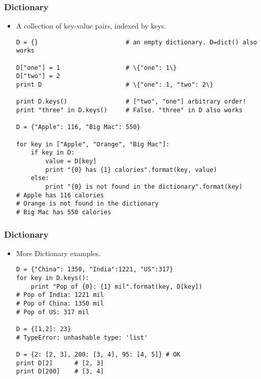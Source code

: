 \documentclass{beamer}
\begin{document}
\begin{frame}[fragile]
\frametitle{Dictionary}
\begin{itemize}
\item A collection of key-value pairs, indexed by keys.
\begin{lstlisting}
D = {}                        # an empty dictionary. D=dict() also works

D["one"] = 1                  # \{"one": 1\}   
D["two"] = 2             
print D                       # \{"one": 1, "two": 2\}

print D.keys()                # ["two", "one"] arbitrary order!
print "three" in D.keys()     # False. "three" in D also works

D = {"Apple": 116, "Big Mac": 550}

for key in ["Apple", "Orange", "Big Mac"]:
    if key in D:
        value = D[key]
        print "{0} has {1} calories".format(key, value)
    else:
        print "{0} is not found in the dictionary".format(key)
# Apple has 116 calories
# Orange is not found in the dictionary
# Big Mac has 550 calories
\end{lstlisting}
\end{itemize}
\end{frame}
 
\begin{frame}[fragile]
\frametitle{Dictionary}
\begin{itemize}
\item More Dictionary examples.
\begin{lstlisting}
D = {"China": 1350, "India":1221, "US":317}
for key in D.keys():
    print "Pop of {0}: {1} mil".format(key, D[key])
# Pop of India: 1221 mil
# Pop of China: 1350 mil
# Pop of US: 317 mil

D = {[1,2]: 23}
# TypeError: unhashable type: 'list'

D = {2: [2, 3], 200: [3, 4], 95: [4, 5]} # OK
print D[2]      # [2, 3]
print D[200]    # [3, 4]
\end{lstlisting}
\end{itemize}
\end{frame}
\end{document}
